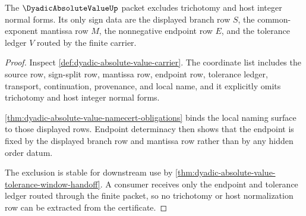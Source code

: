 \begin{theorem}
\label{thm:dyadic-absolute-value-sign-split-exclusion}
The $\DyadicAbsoluteValueUp$ packet excludes trichotomy and host integer normal forms. Its only sign data are the displayed branch row $S$, the common-exponent mantissa row $M$, the nonnegative endpoint row $E$, and the tolerance ledger $V$ routed by the finite carrier.
\end{theorem}
\begin{proof}
Inspect \autoref{def:dyadic-absolute-value-carrier}. The coordinate list includes the source row, sign-split row, mantissa row, endpoint row, tolerance ledger, transport, continuation, provenance, and local name, and it explicitly omits trichotomy and host integer normal forms.

\autoref{thm:dyadic-absolute-value-namecert-obligations} binds the local naming surface to those displayed rows. Endpoint determinacy then shows that the endpoint is fixed by the displayed branch row and mantissa row rather than by any hidden order datum.

The exclusion is stable for downstream use by \autoref{thm:dyadic-absolute-value-tolerance-window-handoff}. A consumer receives only the endpoint and tolerance ledger routed through the finite packet, so no trichotomy or host normalization row can be extracted from the certificate.
\end{proof}

